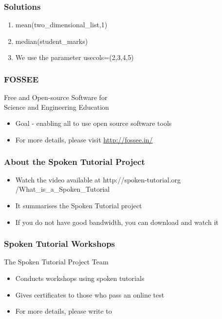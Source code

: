 \documentclass[17pt,compress]{beamer}
\begin{document}
\begin{frame}
\frametitle{Solutions}
\label{sec-9}


\begin{enumerate}
\item mean(two\_dimensional\_list,1)\pause
\vspace{12pt}
\item median(student\_marks)\pause
\vspace{12pt}
\item We use the parameter usecols=(2,3,4,5)
\end{enumerate}
\end{frame}
\begin{frame}
\frametitle{FOSSEE}
{\color{blue}Free and Open-source Software for \\Science and Engineering Education} \\
\begin{itemize}
\item Goal - enabling all to use open source software tools
\item For more details, please visit {\color{blue}\url{http://fossee.in/}}
\end{itemize}
\end{frame}
\begin{frame}
\frametitle{About the Spoken Tutorial Project}
\begin{itemize}
\item Watch the video available at {\color{blue}http://spoken-tutorial.org /What\_is\_a\_Spoken\_Tutorial}
\item It summarises the Spoken Tutorial project \pause
\item If you do not have good bandwidth, you can download and watch it
\end{itemize}
\end{frame}
\begin{frame}
\frametitle{Spoken Tutorial Workshops}The Spoken Tutorial Project Team 
\begin{itemize}
\item Conducts workshops using spoken tutorials 
\item Gives certificates to those who pass an online test 
\item For more details, please write to \\ 
\end{itemize}
\end{frame}
\end{document}

